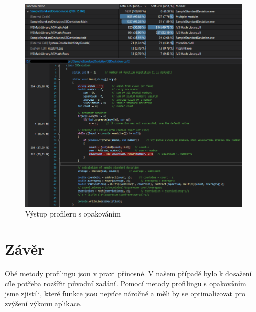 \documentclass{article}
\begin{document}
\begin{figure}[h]
\centering
\includegraphics[scale=0.54]{vystup-data1000-withN-10000}
\caption{Výstup profileru s opakováním}
\label{profiler:data1000-withN-10000}
\end{figure}

\section{Závěr}
Obě metody profilingu jsou v praxi přínosné. V našem případě bylo k dosažení cíle potřeba rozšířit původní zadání. Pomocí metody profilingu s opakováním jsme zjistili, které funkce jsou nejvíce náročné a měli by se optimalizovat pro zvýšení výkonu aplikace.
\end{document}

